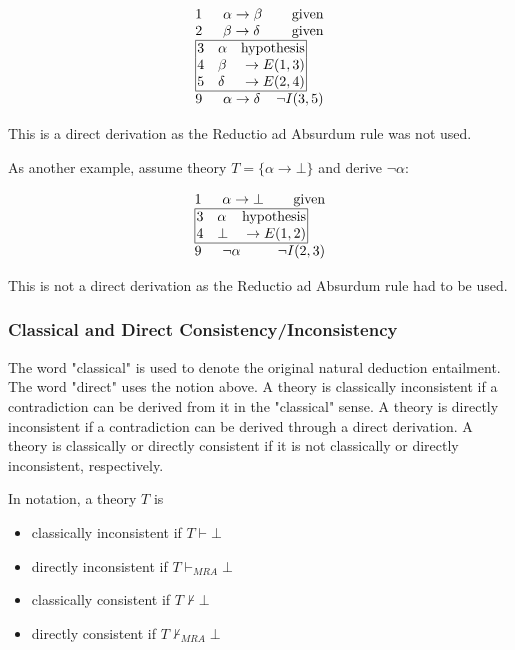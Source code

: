 \documentclass[11pt,twoside,a4paper]{report}
\begin{document}
\[\vbox{\offinterlineskip\halign{
&\tabskip=1.5em#\strut&$#$\hfil\tabskip=1em&\hfil$#$\tabskip=0em\cr
%
1&\alpha\rightarrow\beta&\mbox{given}\cr
2&\beta\rightarrow\delta&\mbox{given}\cr
%
\multispan3\vbox{\halign{
\vrule#&&\hskip.1em\tabskip=1em#\strut&$#$\hfil\tabskip=1em&\hfil$#$\hskip0.1em\tabskip=0em&\vrule#\cr
\noalign{\hrule}
%
&3&\alpha&\mbox{hypothesis}&\cr
&4&\beta&\rightarrow E(1,3)&\cr
&5&\delta&\rightarrow E(2,4)&\cr
%
\noalign{\hrule}}}\,\cr
%
9&\alpha\rightarrow\delta&\neg I(3,5)\cr
}}\]

This is a direct derivation as the Reductio ad Absurdum rule was not used.

As another example, assume theory $T = \{\alpha\rightarrow\bot\}$ and derive $\neg\alpha$:

\[\vbox{\offinterlineskip\halign{
&\tabskip=1.5em#\strut&$#$\hfil\tabskip=1em&\hfil$#$\tabskip=0em\cr
%
1&\alpha\rightarrow\bot&\mbox{given}\cr
%
\multispan3\vbox{\halign{
\vrule#&&\hskip.1em\tabskip=1em#\strut&$#$\hfil\tabskip=1em&\hfil$#$\hskip0.1em\tabskip=0em&\vrule#\cr
\noalign{\hrule}
%
&3&\alpha&\mbox{hypothesis}&\cr
&4&\bot&\rightarrow E(1,2)&\cr
%
\noalign{\hrule}}}\,\cr
%
9&\neg\alpha&\neg I(2,3)\cr
}}\]

This is not a direct derivation as the Reductio ad Absurdum rule had to be used.

\subsubsection{Classical and Direct Consistency/Inconsistency}
The word "classical" is used to denote the original natural deduction entailment. The word "direct" uses the notion above. A theory is classically inconsistent if a contradiction can be derived from it in the "classical" sense. A theory is directly inconsistent if a contradiction can be derived through a direct derivation. A theory is classically or directly consistent if it is not classically or directly inconsistent, respectively.

In notation, a theory $T$ is
\begin{itemize}
\item
classically inconsistent if $T\vdash\bot$
\item
directly inconsistent if $T\vdash_{MRA}\bot$
\item
classically consistent if $T\nvdash\bot$
\item
directly consistent if $T\nvdash_{MRA}\bot$
\end{itemize}
\end{document}

